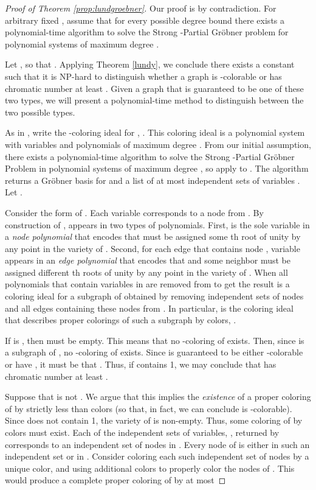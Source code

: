 \documentclass{article}
\begin{document}
\begin{proof}[Proof of Theorem \ref{prop:lundgroebner}]
Our proof is by contradiction. For arbitrary fixed , assume that for every possible degree bound  there exists a polynomial-time algorithm  to solve the Strong \nobreakdash-Partial Gr\"{o}bner problem for polynomial systems of maximum degree .

Let , so that . Applying Theorem \ref{lundy}, we conclude there exists a constant  such that it is NP-hard to distinguish whether a graph is -colorable or has chromatic number at least . Given a graph  that is guaranteed to be one of these two types, we will present a polynomial-time method to distinguish between the two possible types.

As in \cite{deloera}, write the -coloring ideal for , . This coloring ideal is a polynomial system with  variables and  polynomials of maximum degree . From our initial assumption, there exists a polynomial-time algorithm  to solve the Strong \nobreakdash-Partial Gr\"{o}bner Problem in polynomial systems of maximum degree , so apply  to .  The algorithm  returns a Gr\"{o}bner basis  for  and a list of at most  independent sets of variables . Let .

Consider the form of . Each variable  corresponds to a node  from . By construction of ,  appears in two types of polynomials. First,  is the sole variable in a \emph{node polynomial} that encodes that  must be assigned some th root of unity by any point in the variety of . Second, for each edge that contains node , variable  appears in an \emph{edge polynomial} that encodes that  and some neighbor must be assigned different th roots of unity by any point in the variety of . When all polynomials that contain variables in  are removed from  to get  the result is a coloring ideal for a subgraph  of  obtained by removing  independent sets of nodes and all edges containing these nodes from . In particular,  is the coloring ideal that describes proper colorings of such a subgraph  by  colors, .

If  is , then  must be empty. This means that no \nobreakdash-coloring of  exists. Then, since  is a subgraph of , no -coloring of  exists. Since  is guaranteed to be either \nobreakdash-colorable or have , it must be that . Thus, if  contains 1, we may conclude that  has chromatic number at least .

Suppose that  is not . We argue that this implies the \emph{existence} of a proper coloring of  by strictly less than  colors (so that, in fact, we can conclude  is \nobreakdash-colorable). Since  does not contain 1, the variety of   is non-empty. Thus, some coloring of  by  colors must exist. Each of the  independent sets of variables, , returned by  corresponds to an independent set of nodes in . Every node of  is either in such an independent set or in . Consider coloring each such independent set of nodes by a unique color, and using  additional colors to properly color the nodes of . This would produce a complete proper coloring of  by 
at most


\end{proof}
\end{document}
